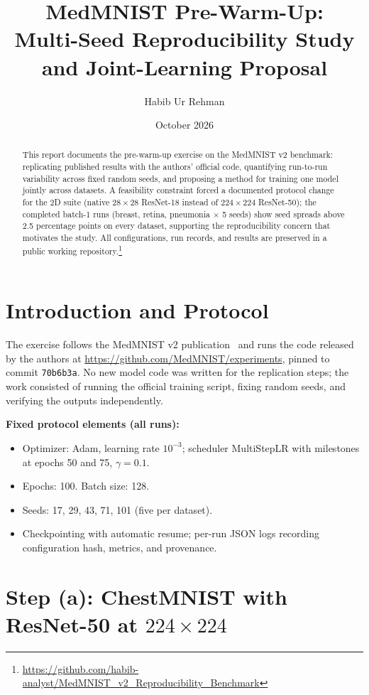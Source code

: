 \documentclass[11pt,a4paper]{article}
\title{MedMNIST Pre-Warm-Up:\\Multi-Seed Reproducibility Study and Joint-Learning Proposal}
\author{Habib Ur Rehman}
\date{October 2026}
\begin{document}
\maketitle

\begin{abstract}
This report documents the pre-warm-up exercise on the MedMNIST v2 benchmark:
replicating published results with the authors' official code, quantifying
run-to-run variability across fixed random seeds, and proposing a method for
training one model jointly across datasets. A feasibility constraint forced a
documented protocol change for the 2D suite (native $28 \times 28$ ResNet-18
instead of $224 \times 224$ ResNet-50); the completed batch-1 runs
(breast, retina, pneumonia $\times$ 5 seeds) show seed spreads above 2.5
percentage points on every dataset, supporting the reproducibility concern
that motivates the study. All configurations, run records, and results are preserved
in a public working repository.\footnote{\url{https://github.com/habib-analyst/MedMNIST_v2_Reproducibility_Benchmark}}
\end{abstract}

\section{Introduction and Protocol}

The exercise follows the MedMNIST v2 publication~\cite{medmnistv2} and runs the
code released by the authors at \url{https://github.com/MedMNIST/experiments},
pinned to commit \texttt{70b6b3a}. No new model code was written for the
replication steps; the work consisted of running the official training script,
fixing random seeds, and verifying the outputs independently.

\noindent\textbf{Fixed protocol elements (all runs):}
\begin{itemize}[nosep]
    \item Optimizer: Adam, learning rate $10^{-3}$; scheduler MultiStepLR with
    milestones at epochs 50 and 75, $\gamma = 0.1$.
    \item Epochs: 100. Batch size: 128.
    \item Seeds: 17, 29, 43, 71, 101 (five per dataset).
    \item Checkpointing with automatic resume; per-run JSON logs recording
    configuration hash, metrics, and provenance.
\end{itemize}

\section{Step (a): ChestMNIST with ResNet-50 at $224 \times 224$}
\end{document}
